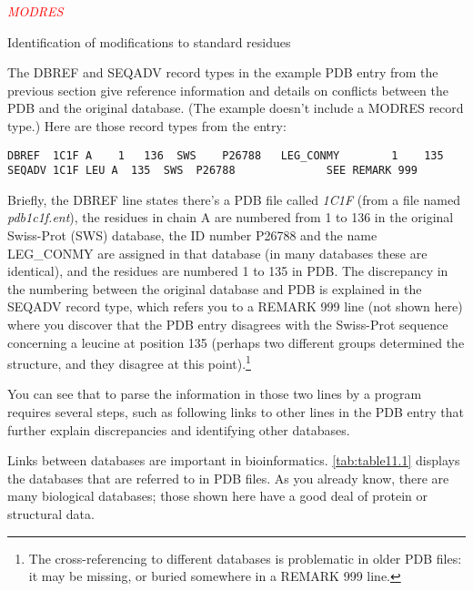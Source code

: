 \textcolor{red}{\textit{MODRES}}
\begin{adjustwidth}{1cm}{}
Identification of modifications to standard residues 
\end{adjustwidth}

The DBREF and SEQADV record types in the example PDB entry from the previous section give reference information and details on conflicts between the PDB and the original database. (The example doesn't include a MODRES record type.) Here are those record types from the entry: 

\begin{lstlisting}
DBREF  1C1F A    1   136  SWS    P26788   LEG_CONMY        1    135             
SEQADV 1C1F LEU A  135  SWS  P26788              SEE REMARK 999 
\end{lstlisting}

Briefly, the DBREF line states there's a PDB file called \textit{1C1F} (from a file named \textit{pdb1c1f.ent}), the residues in chain A are numbered from 1 to 136 in the original Swiss-Prot (SWS) database, the ID number P26788 and the name LEG\_CONMY are assigned in that database (in many databases these are identical), and the residues are numbered 1 to 135 in PDB. The discrepancy in the numbering between the original database and PDB is explained in the SEQADV record type, which refers you to a REMARK 999 line (not shown here) where you discover that the PDB entry disagrees with the Swiss-Prot sequence concerning a leucine at position 135 (perhaps two different groups determined the structure, and they disagree at this point).\footnote{The cross-referencing to different databases is problematic in older PDB files: it may be missing, or buried somewhere in a REMARK 999 line.} 

You can see that to parse the information in those two lines by a program requires several steps, such as following links to other lines in the PDB entry that further explain discrepancies and identifying other databases.

Links between databases are important in bioinformatics. \autoref{tab:table11.1} displays the databases that are referred to in PDB files. As you already know, there are many biological databases; those shown here have a good deal of protein or structural data. 

